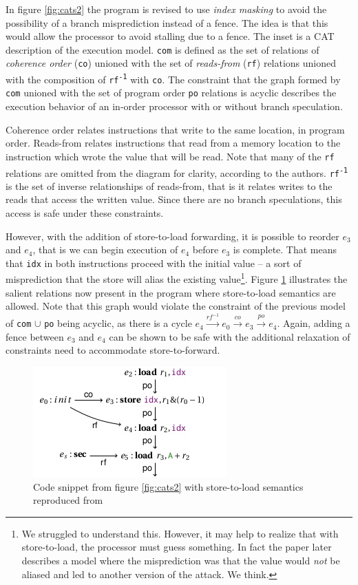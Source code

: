 \documentclass[11pt,conference]{IEEEtran}
\begin{document}
In figure \ref{fig:cats2} the program is revised to use \emph{index masking} to avoid the possibility of a branch misprediction instead of a fence.
The idea is that this would allow the processor to avoid stalling due to a fence.
The inset is a CAT description of the execution model.
\texttt{com} is defined as the set of relations of \emph{coherence order} (\texttt{co}) unioned with the set of \emph{reads-from} (\texttt{rf}) relations unioned with the composition of \texttt{rf\textsuperscript{-1}} with \texttt{co}.
The constraint that the graph formed by \texttt{com} unioned with the set of program order \texttt{po} relations is acyclic describes the execution behavior of an in-order processor with or without branch speculation.

Coherence order relates instructions that write to the same location, in program order.
Reads-from relates instructions that read from a memory location to the instruction which wrote the value that will be read.
Note that many of the \texttt{rf} relations are omitted from the diagram for clarity, according to the authors.
\texttt{rf\textsuperscript{-1}} is the set of inverse relationships of reads-from, that is it relates writes to the reads that access the written value.
Since there are no branch speculations, this access is safe under these constraints.

However, with the addition of store-to-load forwarding, it is possible to reorder $e_3$ and $e_4$, that is we can begin execution of $e_4$ before $e_3$ is complete.
That means that \texttt{idx} in both instructions proceed with the initial value -- a sort of misprediction that the store will alias the existing value\footnote{
	We struggled to understand this.
	However, it may help to realize that with store-to-load, the processor must guess something.
	In fact the paper later describes a model where the misprediction was that the value would \emph{not} be aliased and led to another version of the attack.
	We think.
}.
Figure \ref{fig:cats3} illustrates the salient relations now present in the program where store-to-load semantics are allowed.
Note that this graph would violate the constraint of the previous model of \texttt{com} $\cup$ \texttt{po} being acyclic, as there is a cycle $e_4\xrightarrow{rf^{-1}}e_0\xrightarrow{co}e_3\xrightarrow{po}e_4$.
Again, adding a fence between $e_3$ and $e_4$ can be shown to be safe with the additional relaxation of constraints need to accommodate store-to-forward.

\begin{figure}[t]
  \centering
  \includegraphics[width=0.6\linewidth]{cats3}
	\caption{Code snippet from figure \ref{fig:cats2} with store-to-load semantics reproduced from \cite{cats2022}}
  \label{fig:cats3}
\end{figure}
\end{document}
